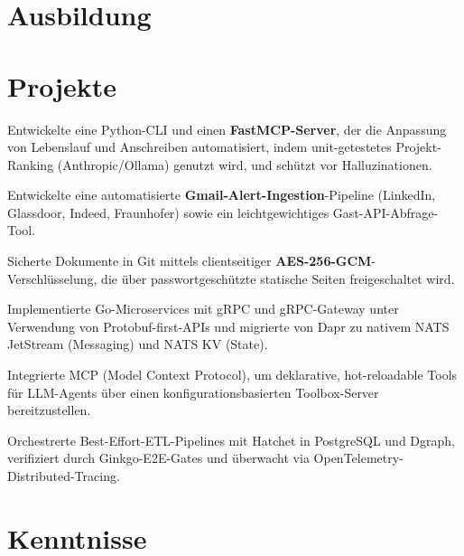 \documentclass[10pt,a4paper]{resume}
\begin{document}
\section{Ausbildung}

\vspace{2pt}

\section{Projekte}

\bullets
  \item Entwickelte eine Python-CLI und einen \textbf{FastMCP-Server}, der die Anpassung von Lebenslauf und Anschreiben automatisiert, indem unit-getestetes Projekt-Ranking (Anthropic/Ollama) genutzt wird, und schützt vor Halluzinationen.
  \item Entwickelte eine automatisierte \textbf{Gmail-Alert-Ingestion}-Pipeline (LinkedIn, Glassdoor, Indeed, Fraunhofer) sowie ein leichtgewichtiges Gast-API-Abfrage-Tool.
  \item Sicherte Dokumente in Git mittels clientseitiger \textbf{AES-256-GCM}-Verschlüsselung, die über passwortgeschützte statische Seiten freigeschaltet wird.
\bulletsend
\vspace{1.0pt}
\bullets
  \item Implementierte Go-Microservices mit gRPC und gRPC-Gateway unter Verwendung von Protobuf-first-APIs und migrierte von Dapr zu nativem NATS JetStream (Messaging) und NATS KV (State).
  \item Integrierte MCP (Model Context Protocol), um deklarative, hot-reloadable Tools für LLM-Agents über einen konfigurationsbasierten Toolbox-Server bereitzustellen.
  \item Orchestrerte Best-Effort-ETL-Pipelines mit Hatchet in PostgreSQL und Dgraph, verifiziert durch Ginkgo-E2E-Gates und überwacht via OpenTelemetry-Distributed-Tracing.
\bulletsend

\section{Kenntnisse}
\end{document}
